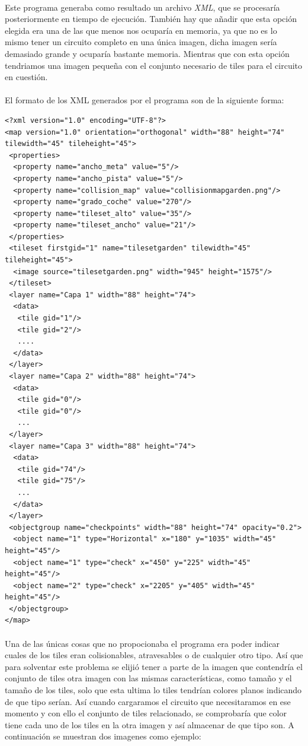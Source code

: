 \paragraph{}
Este programa generaba como resultado un archivo \emph{XML}, que se procesaría posteriormente en tiempo de ejecución. También hay
que añadir que esta opción elegida era una de las que menos nos ocuparía en memoria, ya que no es lo mismo tener un circuito 
completo en una única imagen, dicha imagen sería demasiado grande y ocuparía bastante memoria. Mientras
que con esta opción tendriamos una imagen pequeña con el conjunto necesario de tiles para el circuito en cuestión.

\paragraph{}
El formato de los XML generados por el programa son de la siguiente forma:

\begin{lstlisting}[style=XML]
<?xml version="1.0" encoding="UTF-8"?>
<map version="1.0" orientation="orthogonal" width="88" height="74" tilewidth="45" tileheight="45">
 <properties>
  <property name="ancho_meta" value="5"/>
  <property name="ancho_pista" value="5"/>
  <property name="collision_map" value="collisionmapgarden.png"/>
  <property name="grado_coche" value="270"/>
  <property name="tileset_alto" value="35"/>
  <property name="tileset_ancho" value="21"/>
 </properties>
 <tileset firstgid="1" name="tilesetgarden" tilewidth="45" tileheight="45">
  <image source="tilesetgarden.png" width="945" height="1575"/>
 </tileset>
 <layer name="Capa 1" width="88" height="74">
  <data>   
   <tile gid="1"/>
   <tile gid="2"/>
   ....
  </data>   
 </layer>
 <layer name="Capa 2" width="88" height="74">
  <data>
   <tile gid="0"/>
   <tile gid="0"/>
   ...
 </layer>
 <layer name="Capa 3" width="88" height="74">
  <data>
   <tile gid="74"/>
   <tile gid="75"/>
   ...
  </data>
 </layer>
 <objectgroup name="checkpoints" width="88" height="74" opacity="0.2">
  <object name="1" type="Horizontal" x="180" y="1035" width="45" height="45"/>
  <object name="1" type="check" x="450" y="225" width="45" height="45"/>
  <object name="2" type="check" x="2205" y="405" width="45" height="45"/>
 </objectgroup>
</map>
\end{lstlisting}

\paragraph{}
Una de las únicas cosas que no propocionaba el programa era poder indicar cuales de los tiles eran colisionables, atravesables o
de cualquier otro tipo. Así que para solventar este problema se elijió tener a parte de la imagen que contendría el conjunto de 
tiles otra imagen con las mismas características, como tamaño y el tamaño de los tiles, solo que esta ultima lo tiles tendrían 
colores planos indicando de que tipo serían. Así cuando cargaramos el circuito que necesitaramos en ese momento y con ello
el conjunto de tiles relacionado, se comprobaría que color tiene cada uno de los tiles en la otra imagen y así almacenar
de que tipo son. A continuación se muestran dos imagenes como ejemplo:

